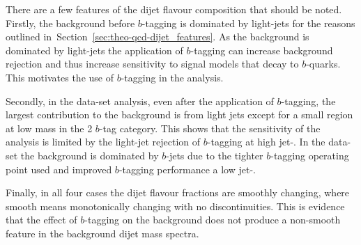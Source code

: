 There are a few features of the dijet flavour composition that should be noted.
Firstly, the background before $b$-tagging is dominated by light-jets
for the reasons outlined in~Section~\ref{sec:theo-qcd-dijet_features}.
As the background is dominated by light-jets the application
of $b$-tagging can increase background rejection
and thus increase sensitivity to signal models that decay to $b$-quarks.
This motivates the use of $b$-tagging in the analysis.

Secondly, in the \summer{} data-set analysis,
even after the application of $b$-tagging,
the largest contribution to the background is from light jets
except for a small region at low mass in the 2 $b$-tag category.
This shows that the sensitivity of the analysis is limited by the
light-jet rejection of $b$-tagging at high jet-\pT.
In the \lm{} data-set the background is dominated by $b$-jets
due to the tighter $b$-tagging operating point used and improved $b$-tagging performance a low jet-\pT.

Finally, in all four cases the dijet flavour fractions are smoothly changing,
where smooth means monotonically changing with no discontinuities.
This is evidence that the effect of $b$-tagging on the background does not produce
a non-smooth feature in the background dijet mass spectra.


